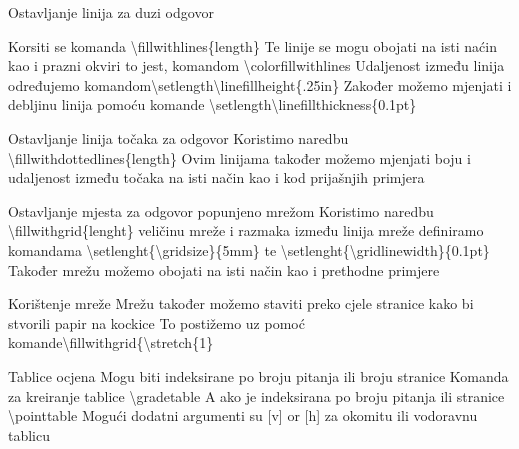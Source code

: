 \documentclass[addpoints,answers]{beamer}
\begin{document}
\begin{frame}{Ostavljanje linija za duzi odgovor}

Korsiti se komanda \color{blue}\textbackslash{fillwithlines\{length\}}\color{black}\newline\newline
Te linije se mogu obojati na isti naćin kao i prazni okviri to jest, komandom \color{blue}\textbackslash{colorfillwithlines}\color{black}
\newline
Udaljenost između linija određujemo komandom\color{blue}\textbackslash{setlength}\textbackslash{linefillheight\{.25in\}}\color{black}\newline
Zakođer možemo mjenjati i debljinu linija pomoću komande\color{blue} \textbackslash{setlength}\textbackslash{linefillthickness\{0.1pt\}}
\end{frame}

\begin{frame}{Ostavljanje linija točaka za odgovor}
Koristimo naredbu  \color{blue}\textbackslash{fillwithdottedlines\{length\}}\color{black}\newline
Ovim linijama također možemo mjenjati boju i udaljenost između točaka na isti način kao i kod prijašnjih primjera

\end{frame}

\begin{frame}{Ostavljanje mjesta za odgovor popunjeno mrežom}
Koristimo naredbu \color{blue}\textbackslash{fillwithgrid\{lenght\}}\color{black}\newline
veličinu mreže i razmaka između linija mreže definiramo komandama \color{blue}\textbackslash{setlenght\{\textbackslash{gridsize}\}\{5mm\}}\color{black} te \color{blue}\textbackslash{setlenght\{\textbackslash{gridlinewidth}\}\{0.1pt\}}\color{black}
\newline
Također mrežu možemo obojati na isti način kao i prethodne primjere

\end{frame}
\begin{frame}{Korištenje mreže}
Mrežu također možemo staviti preko cjele stranice kako bi stvorili papir na kockice
\newline
To postižemo uz pomoć komande\color{blue}\textbackslash{fillwithgrid\{\textbackslash{stretch\{1\}}}
\end{frame}

%
%	
%
%

\begin{frame}{Tablice ocjena}
Mogu biti indeksirane po broju pitanja ili broju stranice
\newline
Komanda za kreiranje tablice \color{blue}
\textbackslash{gradetable}
\newline
\color{black}
A ako je indeksirana po broju pitanja ili stranice \color{blue} \textbackslash{pointtable}
\color{black}
\newline
Mogući dodatni argumenti su [v] or [h] za okomitu ili vodoravnu tablicu
\end{frame}
\end{document}
